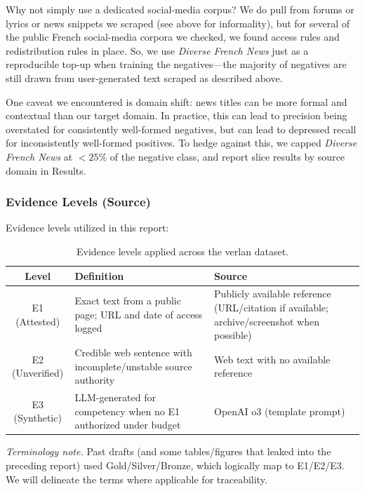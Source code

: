 \documentclass[12pt]{article}
\begin{document}
Why not simply use a dedicated social-media corpus? We do pull from forums or lyrics or news snippets we scraped (see above for informality), but for several of the public French social-media corpora we checked, we found access rules and redistribution rules in place. So, we use \textit{Diverse French News} just as a reproducible top-up when training the negatives—the majority of negatives are still drawn from user-generated text scraped as described above.

One caveat we encountered is domain shift: news titles can be more formal and contextual than our target domain. In practice, this can lead to precision being overstated for consistently well-formed negatives, but can lead to depressed recall for inconsistently well-formed positives. To hedge against this, we capped \textit{Diverse French News} at \(<25\%\) of the negative class, and report slice results by source domain in Results.

\subsubsection{Evidence Levels (Source)}

Evidence levels utilized in this report:

\begin{table}[H]
\centering
\caption{Evidence levels applied across the verlan dataset.}
\begin{tabular}{c|l|l}
\hline
\textbf{Level} & \textbf{Definition} & \textbf{Source} \\
\hline
E1 (Attested)   & Exact text from a public page; URL and date of access logged & Publicly available reference (URL/citation if available; archive/screenshot when possible) \\
E2 (Unverified) & Credible web sentence with incomplete/unstable source authority & Web text with no available reference \\
E3 (Synthetic)  & LLM-generated for competency when no E1 authorized under budget & OpenAI o3 (template prompt) \\
\hline
\end{tabular}
\label{tab:verlan_tiers}
\end{table}

\noindent \textit{Terminology note.} Past drafts (and some tables/figures that leaked into the preceding report) used Gold/Silver/Bronze, which logically map to E1/E2/E3. We will delineate the terms where applicable for traceability.
\end{document}
